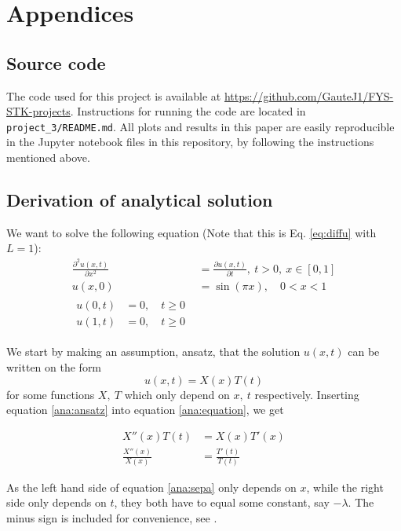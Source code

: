 \section{Appendices}
\subsection{Source code}

The code used for this project is available at \url{https://github.com/GauteJ1/FYS-STK-projects}. Instructions for running the code are located in \texttt{project\_3/README.md}.
All plots and results in this paper are easily reproducible in the Jupyter notebook files in this repository, by following the instructions mentioned above.

\subsection{Derivation of analytical solution}\label{appendixB}
We want to solve the following equation (Note that this is Eq. \ref{eq:diffu} with $L=1$):
\begin{align}\label{ana:equation}
\frac{\partial^2 u(x,t)}{\partial x^2}  &=\frac{\partial u(x,t)}{\partial t}, \ t>0, \ x\in [0, 1] \\
\label{ana:init}
u(x, 0) &= \sin(\pi x), \quad 0 < x < 1 \\
\begin{split}
\label{ana:bound}
    u(0,t) &= 0, \quad t\geq 0 \\
    u(1,t) &= 0, \quad t\geq 0
\end{split}
\end{align}

We start by making an assumption, ansatz, that the solution $u(x,t)$ can be written on the form
\begin{equation}\label{ana:ansatz}
u(x,t) = X(x)T(t)
\end{equation}
for some functions $X,\ T$ which only depend on $x,\ t$ respectively.
Inserting equation \ref{ana:ansatz} into equation \ref{ana:equation}, we get

\begin{align}
    X''(x)T(t) &= X(x) T'(x) \nonumber \\
    \frac{X''(x)}{X(x)} &= \frac{T'(t)}{T(t)} \label{ana:sepa}
\end{align}

As the left hand side of equation \ref{ana:sepa} only depends on $x$, while the right side only depends on $t$, they both have to equal some constant, say $-\lambda$. The minus sign is included for convenience, see \textcite[p. 90]{tveitoPDE}.

